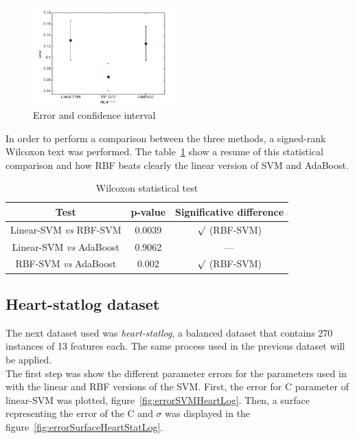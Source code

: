 \documentclass[10pt, journal]{IEEEtran}
\begin{document}
\begin{figure}[ht!]
	\centering
	\includegraphics[width=0.5\textwidth]{img/IonosphereAnalysi}
	\caption{Error and confidence interval}
	\label{fig:IonosphereLogAnalisy}
\end{figure}

In order to perform a comparison between the three methods, a signed-rank Wilcoxon text was performed. The table~\ref{tab:IonosphereWilcoxonTest} show a resume of this statistical comparison and how RBF beats clearly the linear version of SVM and AdaBoost.

\begin{table}[ht!]
	\centering
	\begin{tabular}{|c|c|c|}
		\hline
		\textbf{Test} & \textbf{p-value} & \textbf{Significative difference}\\\hline
		Linear-SVM \emph{vs} RBF-SVM & 0.0039 & $\surd$ (RBF-SVM)\\\hline
		Linear-SVM \emph{vs} AdaBoost & 0.9062 & —\\\hline
		RBF-SVM \emph{vs} AdaBoost & 0.002 & $\surd$ (RBF-SVM)\\\hline
	\end{tabular}
	\label{tab:IonosphereWilcoxonTest}
	\caption{Wilcoxon statistical test}
\end{table}


\subsection{Heart-statlog dataset} %
\label{sub:heart_statlog_dataset}
The next dataset used was \emph{heart-statlog}, a balanced dataset that contains 270 instances of 13 features each. The same process used in the previous dataset will be applied.\\

The first step was show the different parameter errors for the parameters used in with the linear and RBF versions of the SVM. First, the error for C parameter of linear-SVM was plotted, figure~\ref{fig:errorSVMHeartLog}. Then, a surface representing the error of the C and $\sigma$ was displayed in the figure~\ref{fig:errorSurfaceHeartStatLog}.\\
\end{document}
